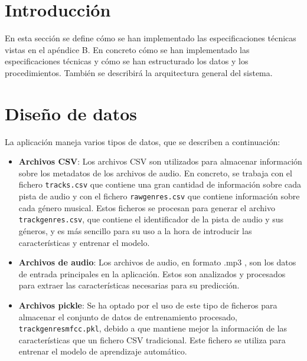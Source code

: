 
\section{Introducción}

En esta sección se define cómo se han implementado las especificaciones técnicas vistas en el apéndice B. En concreto 
cómo se han implementado las especificaciones técnicas y cómo se han estructurado los datos y los procedimientos. 
También se describirá la arquitectura general del sistema.

\section{Diseño de datos}

La aplicación maneja varios tipos de datos, que se describen a continuación:

\begin{itemize}
\tightlist

\item \textbf{Archivos CSV}: Los archivos CSV son utilizados para almacenar información sobre los metadatos de los archivos de audio. \cite{CSV_documentation}
En concreto, se trabaja con el fichero \texttt{tracks.csv} que contiene una gran cantidad de información sobre cada pista de audio y con el fichero \texttt{raw\textunderscore genres.csv} que contiene información sobre cada género musical.
Estos ficheros se procesan para generar el archivo \texttt{track\textunderscore genres.csv}, que contiene el identificador de la pista de audio y sus géneros, y es más sencillo para su uso a la hora de introducir las características y entrenar el modelo.

\item \textbf{Archivos de audio}: Los archivos de audio, en formato .mp3 \cite{MP3}, son los datos de entrada principales en la aplicación. Estos son analizados y procesados para extraer las características necesarias para su predicción.

\item \textbf{Archivos pickle}: Se ha optado por el uso de este tipo de ficheros para almacenar el conjunto de datos de entrenamiento procesado, \texttt{track\textunderscore genres\textunderscore mfcc.pkl}, debido a que mantiene mejor la información de las características que un fichero CSV tradicional.
Este fichero se utiliza para entrenar el modelo de aprendizaje automático. \cite{Selvaraj_2023}

\end{itemize}

